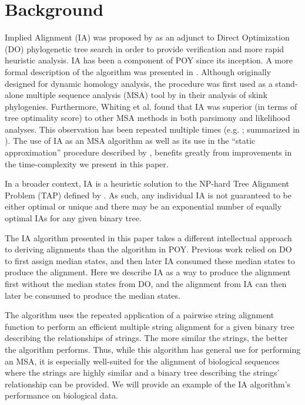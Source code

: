 \documentclass{bmcart}
\begin{document}
\section*{Background}
Implied Alignment (IA) was proposed by \cite{Wheeler2003} as an adjunct to Direct Optimization (DO) \citep{Wheeler1996,VaronandWheeler2012} phylogenetic tree search in order to provide verification and more rapid heuristic analysis.
IA has been a component of POY \citep{Wheeleretal2015, POY5} since its inception.
A more formal description of the algorithm was presented in \cite{Wheeleretal2006}.
Although originally designed for dynamic homology \citep{Wheeler2001} analysis, the procedure was first used as a stand-alone multiple sequence analysis (MSA) tool by \cite{WhitingAetal2006} in their analysis of skink phylogenies.
Furthermore, Whiting et al. found that IA was superior (in terms of tree optimality score) to other MSA methods in both parsimony and likelihood analyses.
This observation has been repeated multiple times (e.g. \citealp{LindgrenandDaly2007, FordandWheeler2015}; summarized in \citealp{Wheeler2012}).
The use of IA as an MSA algorithm as well as its use in the ``static approximation'' procedure described by \cite{Wheeler2003b}, benefits greatly from improvements in the time-complexity we present in this paper.

In a broader context, IA is a heuristic solution to the NP-hard Tree Alignment Problem (TAP) defined by \cite{sankoff1975}.
As such, any individual IA is not guaranteed to be either optimal or unique and there may be an exponential number of equally optimal IAs for any given binary tree.

The IA algorithm presented in this paper takes a different intellectual approach to deriving alignments than the algorithm in POY.
Previous work relied on DO to first assign median states, and then later IA consumed these median states to produce the alignment.
Here we describe IA as a way to produce the alignment first without the median states from DO, and the alignment from IA can then later be consumed to produce the median states.

The algorithm uses the repeated application of a pairwise string alignment function to perform an efficient multiple string alignment for a given binary tree describing the relationships of strings.
The more similar the strings, the better the algorithm performs.
Thus, while this algorithm has general use for performing an MSA, it is especially well-suited for the alignment of biological sequences where the strings are highly similar and a binary tree describing the strings' relationship can be provided. 
We will provide an example of the IA algorithm's performance on biological data.
\end{document}
